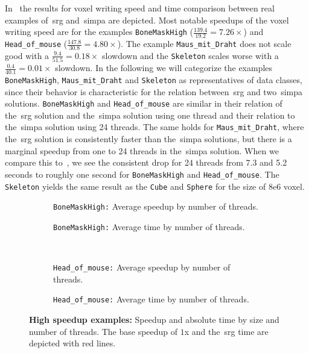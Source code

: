 \documentclass{article}
\begin{document}
In~ the results for voxel writing speed and time comparison between real examples of~\ac{srg} and~\ac{simpa} are depicted.
Most notable speedups of the voxel writing speed are for the examples \texttt{BoneMaskHigh} ($\frac{139.4}{19.2}=7.26\times $) and \texttt{Head\_of\_mouse} ($\frac{147.8}{30.8}=4.80\times $).
The example \texttt{Maus\_mit\_Draht} does not scale good with a $\frac{9.4}{51.5}=0.18\times $ slowdown and the \texttt{Skeleton} scales worse with a $\frac{0.4}{40.1}=0.01\times $ slowdown.
In the following we will categorize the examples \texttt{BoneMaskHigh}, \texttt{Maus\_mit\_Draht} and \texttt{Skeleton} as representatives of data classes,
since their behavior is characteristic for the relation between~\ac{srg} and two~\ac{simpa} solutions.
\texttt{BoneMaskHigh} and \texttt{Head\_of\_mouse} are similar in their relation of the~\ac{srg} solution and the~\ac{simpa} solution using one thread and their relation to the~\ac{simpa} solution using 24 threads.
The same holds for \texttt{Maus\_mit\_Draht}, where the~\ac{srg} solution is consistently faster than the~\ac{simpa} solutions, but there is a marginal speedup from one to 24 threads in the~\ac{simpa} solution.
When we compare this to~, we see the consistent drop for 24 threads from 7.3 and 5.2 seconds to roughly one second for \texttt{BoneMaskHigh} and \texttt{Head\_of\_mouse}.
The \texttt{Skeleton} yields the same result as the \texttt{Cube} and \texttt{Sphere} for the size of 8e6 voxel.
\par
\begin{figure}[!ht]
  \centering \vskip 0pt
  \begin{subfigure}[t]{0.5\textwidth}%
    \centering \vskip 0pt
    \caption{\texttt{BoneMaskHigh:} Average speedup by number of threads.}\label{fig:bonemaskhighspeedup}
  \end{subfigure}%
  \begin{subfigure}[t]{0.5\textwidth}%
    \centering \vskip 0pt
    \caption{\texttt{BoneMaskHigh:} Average time by number of threads.}\label{fig:bonemaskhightime}
  \end{subfigure}%
\\
  \begin{subfigure}[t]{0.5\textwidth}%
    \centering \vskip 0pt
    {}
    \caption{\texttt{Head\_of\_mouse:} Average speedup by number of threads.}\label{fig:headofmousespeedup}
  \end{subfigure}%
  \begin{subfigure}[t]{0.5\textwidth}%
    \centering \vskip 0pt
    \caption{\texttt{Head\_of\_mouse:} Average time by number of threads.}\label{fig:headofmousetime}
  \end{subfigure}%
  \caption{\textbf{High speedup examples:} Speedup and absolute time by size and number of threads. The base speedup of $1$x and the~\ac{srg} time are depicted with red lines.}\label{fig:realexamplesgood}
\end{figure}%
\end{document}
